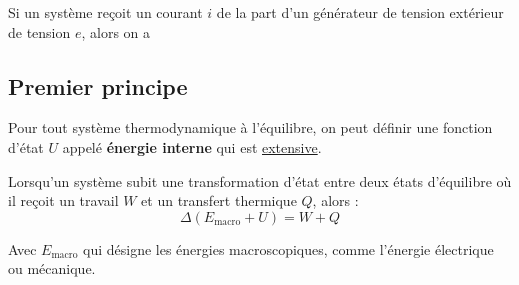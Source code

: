 \documentclass[12pt]{article}
\theoremstyle{cstyle}{\newtheorem{definition}{Définition}[section]}
\theoremstyle{cstyle}{\newtheorem{proposition}[definition]{Propriété}}
\theoremstyle{cstyle}{\newtheorem{theorem}[definition]{Théorème}}
\theoremstyle{mystyle}{\newtheorem{lemma}[definition]{Lemme}}
\theoremstyle{mystyle}{\newtheorem{corollary}[definition]{Corollaire}}
\theoremstyle{mystyle}{\newtheorem*{remark}{Remarque}}
\theoremstyle{mystyle}{\newtheorem*{remarks}{Remarques}}
\theoremstyle{mystyle}{\newtheorem*{example}{Exemple}}
\theoremstyle{mystyle}{\newtheorem*{examples}{Exemples}}
\theoremstyle{definition}{\newtheorem*{exercise}{Exercice}}
\theoremstyle{mystyle}{\newtheorem*{methode}{Méthode}}
\theoremstyle{cstyle}{\newtheorem*{cthm}{}}
\theoremstyle{warn}
\begin{document}
	\newpage
	\begin{minipage}[t]{0.45\textwidth}
		\begin{proposition}
			Si un système reçoit un courant $i$ de la part d'un générateur de tension extérieur de tension $e$, alors on a 
		\end{proposition}
	
		\subsection{Premier principe}
		
		\begin{definition}
			Pour tout système thermodynamique à l'équilibre, on peut définir une fonction d'état \(U\) appelé \textbf{énergie interne} qui est \underline{extensive}. 
		\end{definition}
		
		\begin{theorem}
			Lorsqu'un système subit une transformation d'état entre deux états d'équilibre où il reçoit un travail $W$ et un transfert thermique $Q$, alors :
			\[
				\Delta (E_{\text{macro}} + U) = W + Q
			\]
			
			Avec \(E_\text{macro}\) qui désigne les énergies macroscopiques, comme l'énergie électrique ou mécanique.
		\end{theorem}
	
		
	\end{minipage}
	\hfill
	\vrule
	\hfill
\end{document}
